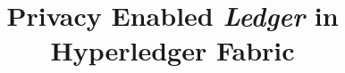 \documentclass{vldb}
\makeatletter
\newcommand{\printfnsymbol}[1]{%
  \textsuperscript{\@fnsymbol{#1}}%
}
\makeatother
\begin{document}

\title{Privacy Enabled \textit{Ledger} in Hyperledger Fabric}
\author[1]{} %
\author[1]{} %
\author[1]{} %
\author[2]{}
\author[1]{}
\affil[ ]{}
\affil[ ]{}


%
%
%
%

\end{document}
